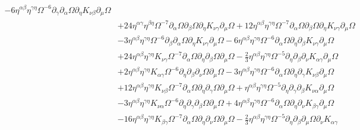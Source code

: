 \documentclass[10pt,letterpaper]{article}
\begin{document}
\begin{align}
 - 6 \eta^{\alpha \beta} \eta^{\gamma \eta} \Omega^{-6} \partial_{\gamma}\partial_{\alpha}\Omega \partial_{\eta}K_{\nu \beta} \partial_{\mu}\Omega\nonumber\\
& + 24 \eta^{\alpha \gamma} \eta^{\beta \eta} \Omega^{-7} \partial_{\alpha}\Omega \partial_{\beta}\Omega \partial_{\eta}K_{\nu \gamma} \partial_{\mu}\Omega
 + 12 \eta^{\alpha \beta} \eta^{\gamma \eta} \Omega^{-7} \partial_{\alpha}\Omega \partial_{\beta}\Omega \partial_{\eta}K_{\nu \gamma} \partial_{\mu}\Omega\nonumber\\
& - 3 \eta^{\alpha \beta} \eta^{\gamma \eta} \Omega^{-6} \partial_{\beta}\partial_{\alpha}\Omega \partial_{\eta}K_{\nu \gamma} \partial_{\mu}\Omega
 - 6 \eta^{\alpha \beta} \eta^{\gamma \eta} \Omega^{-6} \partial_{\alpha}\Omega \partial_{\eta}\partial_{\beta}K_{\nu \gamma} \partial_{\mu}\Omega\nonumber\\
& + 24 \eta^{\alpha \beta} \eta^{\gamma \eta} K_{\nu \gamma} \Omega^{-7} \partial_{\alpha}\Omega \partial_{\eta}\partial_{\beta}\Omega \partial_{\mu}\Omega
 -  \tfrac{2}{3} \eta^{\alpha \beta} \eta^{\gamma \eta} \Omega^{-5} \partial_{\eta}\partial_{\beta}\partial_{\nu}K_{\alpha \gamma} \partial_{\mu}\Omega\nonumber\\
& + 2 \eta^{\alpha \beta} \eta^{\gamma \eta} K_{\alpha \gamma} \Omega^{-6} \partial_{\eta}\partial_{\beta}\partial_{\nu}\Omega \partial_{\mu}\Omega
 - 3 \eta^{\alpha \beta} \eta^{\gamma \eta} \Omega^{-6} \partial_{\alpha}\Omega \partial_{\eta}\partial_{\gamma}K_{\nu \beta} \partial_{\mu}\Omega\nonumber\\
& + 12 \eta^{\alpha \beta} \eta^{\gamma \eta} K_{\nu \beta} \Omega^{-7} \partial_{\alpha}\Omega \partial_{\eta}\partial_{\gamma}\Omega \partial_{\mu}\Omega
 + \eta^{\alpha \beta} \eta^{\gamma \eta} \Omega^{-5} \partial_{\eta}\partial_{\gamma}\partial_{\beta}K_{\nu \alpha} \partial_{\mu}\Omega\nonumber\\
& - 3 \eta^{\alpha \beta} \eta^{\gamma \eta} K_{\nu \alpha} \Omega^{-6} \partial_{\eta}\partial_{\gamma}\partial_{\beta}\Omega \partial_{\mu}\Omega
 + 4 \eta^{\alpha \beta} \eta^{\gamma \eta} \Omega^{-6} \partial_{\alpha}\Omega \partial_{\eta}\partial_{\nu}K_{\beta \gamma} \partial_{\mu}\Omega\nonumber\\
& - 16 \eta^{\alpha \beta} \eta^{\gamma \eta} K_{\beta \gamma} \Omega^{-7} \partial_{\alpha}\Omega \partial_{\eta}\partial_{\nu}\Omega \partial_{\mu}\Omega
 -  \tfrac{2}{3} \eta^{\alpha \beta} \eta^{\gamma \eta} \Omega^{-5} \partial_{\eta}\partial_{\beta}\partial_{\mu}\Omega \partial_{\nu}K_{\alpha \gamma}\nonumber\\

\end{align}
\end{document}
